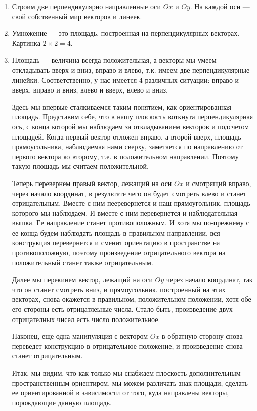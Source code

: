 \begin{enumerate}
\item Строим две перпендикулярно направленные оси $Ox$ и $Oy$. На каждой оси --- свой собственный мир векторов и линеек.
\item Умножение --- это площадь, построенная на перпендикулярных векторах. Картинка $2\times 2=4$.
\item Площадь --- величина всегда положительная, а векторы мы умеем откладывать вверх и вниз, вправо и влево, т.к. имеем две перпендикулярные линейки. Соответственно, у нас имеется 4 различных ситуации: вправо и вверх, вправо и вниз, влево и вверх, влево и вниз.

Здесь мы впервые сталкиваемся таким понятием, как ориентированная площадь. Представим себе, что в нашу плоскость воткнута перпендикулярная ось, с конца которой мы наблюдаем за откладыванием векторов и подсчетом площадей. Когда первый вектор отложен вправо, а второй вверх, площадь прямоугольника, наблюдаемая нами сверху, заметается по направлению от первого вектора ко второму, т.е. в положительном направлении. Поэтому такую площадь мы считаем положительной.

Теперь перевернем правый вектор, лежащий на оси $Ox$ и смотрящий вправо, через начало координат, в результате чего он будет смотреть влево и станет отрицательным. Вместе с ним пееревернется и наш прямоугольник, площадь которого мы наблюдаем. И вместе с ним перевернется и наблюдательная вышка. Ее направление станет противоположным. И хотя мы по-прежнему с ее конца будем наблюдать площадь в правильном направлении, вся конструкция перевернется и сменит ориентацию в пространстве на противоположную, поэтому произведение отрицательного вектора на положительный станет также отрицательным.

Далее мы перекинем вектор, лежащий на оси $Oy$ через начало координат, так что он станет смотреть вниз, и прямоугольник. построенный на этих векторах, снова окажется в правильном, положительном положении, хотя обе его стороны есть отрицатлеьные числа. Стало быть, произведение двух отрицателных чисел есть число положительное.

Наконец, еще одна манипуляция с вектором $Ox$ в обратную сторону снова переведет конструкцию в отрицательное положение, и произведение снова станет отрицательным.

Итак, мы видим, что как только мы снабжаем плоскость дополнительным пространственным ориентиром, мы можем различать знак площади, сделать ее ориентированной в зависимости от того, куда направлены векторы, порождающие данную площадь.


\end{enumerate}
